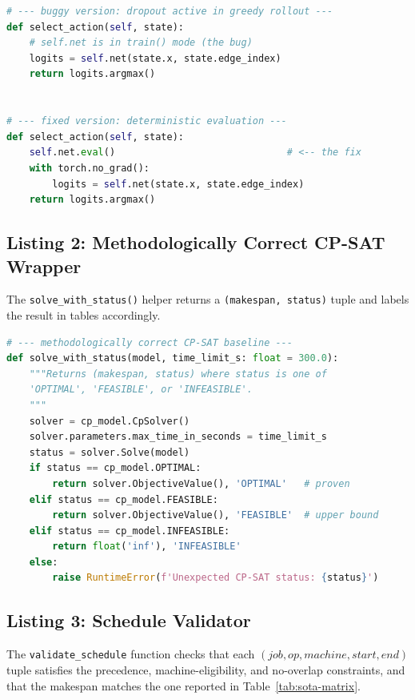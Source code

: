 \documentclass[10pt]{article}
\theoremstyle{definition}
\begin{document}
\begin{lstlisting}[language=python, basicstyle=\ttfamily\footnotesize]
# --- buggy version: dropout active in greedy rollout ---
def select_action(self, state):
    # self.net is in train() mode (the bug)
    logits = self.net(state.x, state.edge_index)
    return logits.argmax()


# --- fixed version: deterministic evaluation ---
def select_action(self, state):
    self.net.eval()                              # <-- the fix
    with torch.no_grad():
        logits = self.net(state.x, state.edge_index)
    return logits.argmax()
\end{lstlisting}

\subsection*{Listing 2: Methodologically Correct CP-SAT Wrapper}
The \texttt{solve\_with\_status()} helper returns a
\texttt{(makespan, status)} tuple and labels the
result in tables accordingly.

\begin{lstlisting}[language=python, basicstyle=\ttfamily\footnotesize]
# --- methodologically correct CP-SAT baseline ---
def solve_with_status(model, time_limit_s: float = 300.0):
    """Returns (makespan, status) where status is one of
    'OPTIMAL', 'FEASIBLE', or 'INFEASIBLE'.
    """
    solver = cp_model.CpSolver()
    solver.parameters.max_time_in_seconds = time_limit_s
    status = solver.Solve(model)
    if status == cp_model.OPTIMAL:
        return solver.ObjectiveValue(), 'OPTIMAL'   # proven
    elif status == cp_model.FEASIBLE:
        return solver.ObjectiveValue(), 'FEASIBLE'  # upper bound
    elif status == cp_model.INFEASIBLE:
        return float('inf'), 'INFEASIBLE'
    else:
        raise RuntimeError(f'Unexpected CP-SAT status: {status}')
\end{lstlisting}

\subsection*{Listing 3: Schedule Validator}
The \texttt{validate\_schedule} function checks that
each $(job, op, machine, start, end)$ tuple satisfies
the precedence, machine-eligibility, and no-overlap
constraints, and that the makespan matches the one
reported in Table~\ref{tab:sota-matrix}.
\end{document}
